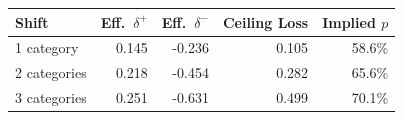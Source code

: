 \begin{tabular}{lrrrr}
\toprule
Shift & Eff.\ $\delta^+$ & Eff.\ $\delta^-$ & Ceiling Loss & Implied $p$ \\
\midrule
1 category & 0.145 & -0.236 & 0.105 & 58.6\% \\
2 categories & 0.218 & -0.454 & 0.282 & 65.6\% \\
3 categories & 0.251 & -0.631 & 0.499 & 70.1\% \\
\bottomrule
\end{tabular}
